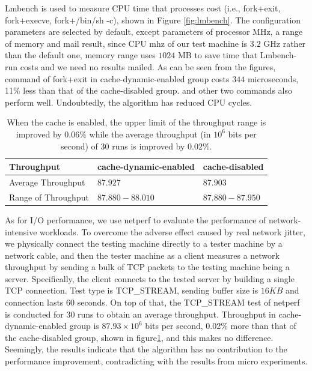 Lmbench is used to measure CPU time that processes cost (i.e., fork+exit, fork+execve, fork+/bin/sh -c), shown in Figure \ref{fig:lmbench}. The configuration parameters are selected by default, except parameters of processor MHz, a range of memory and mail result, since CPU mhz of our test machine is $3.2$ GHz rather than the default one, memory range uses $1024$ MB to save time that Lmbench-run costs and we need no results mailed. As can be seen from the figures, command of fork+exit in cache-dynamic-enabled group costs $344$ microseconds, 11\% less than that of the cache-disabled group. and other two commands also perform well. Undoubtedly, the algorithm has reduced CPU cycles.


\begin{table}[!ht]
\footnotesize
\begin{center}
\begin{tabular}{|l|l|l}
\hline
{\textbf{Throughput}} & {\textbf{cache-dynamic-enabled}} & {\textbf{cache-disabled}}    \\ \hline
Average Throughput &  $87.927$ & $87.903$ \\ \hline
Range of Throughput & $87.880-88.010$ & $87.880-87.950$ \\ \hline
\end{tabular}
\end{center}
\caption{When the cache is enabled, the upper limit of the throughput range is improved by 0.06\% while the average throughput (in $10^6$ bits per second) of 30 runs is improved by 0.02\%. }
\label{tab:netperf}
\end{table}

As for I/O performance, we use netperf to evaluate the performance of network-intensive workloads. To overcome the adverse effect caused by real network jitter, we physically connect the testing machine directly to a tester machine by a network cable, and then the tester machine as a client measures a network throughput by sending a bulk of TCP packets to the testing machine being a server. Specifically, the client connects to the tested server by building a single TCP connection. Test type is TCP\_STREAM, sending buffer size is $16KB$ and connection lasts $60$ seconds. On top of that, the TCP\_STREAM test of netperf is conducted for $30$ runs to obtain an average throughput. Throughput in cache-dynamic-enabled group is $87.93 \times 10^6$ bits per second, 0.02\% more than that of the cache-disabled group, shown in figure\ref{tab:netperf}, and this makes no difference.
Seemingly, the results indicate that the algorithm has no contribution to the performance improvement, contradicting with the results from micro experiments.

